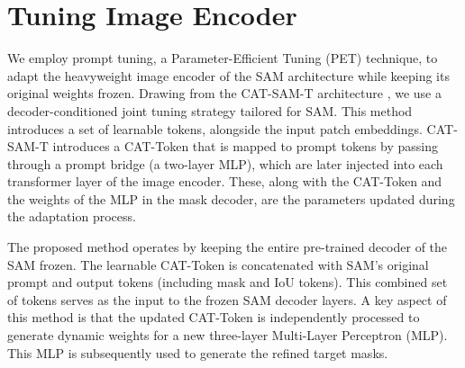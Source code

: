 \section{Tuning Image Encoder}
We employ prompt tuning, a Parameter-Efficient Tuning (PET) technique, to adapt the heavyweight image encoder of the SAM architecture while keeping its original weights frozen. Drawing from the CAT-SAM-T architecture \cite{xiao2024cat}, we use a decoder-conditioned joint tuning strategy tailored for SAM. This method introduces a set of learnable tokens, alongside the input patch embeddings. CAT-SAM-T introduces a CAT-Token that is mapped to prompt tokens by passing through a prompt bridge (a two-layer MLP), which are later injected into each transformer layer of the image encoder. These, along with the CAT-Token and the weights of the MLP in the mask decoder, are the parameters updated during the adaptation process.

The proposed method operates by keeping the entire pre-trained decoder of the SAM frozen. The learnable CAT-Token is concatenated with SAM's original prompt and output tokens (including mask and IoU tokens). This combined set of tokens serves as the input to the frozen SAM decoder layers. A key aspect of this method is that the updated CAT-Token is independently processed to generate dynamic weights for a new three-layer Multi-Layer Perceptron (MLP). This MLP is subsequently used to generate the refined target masks.

